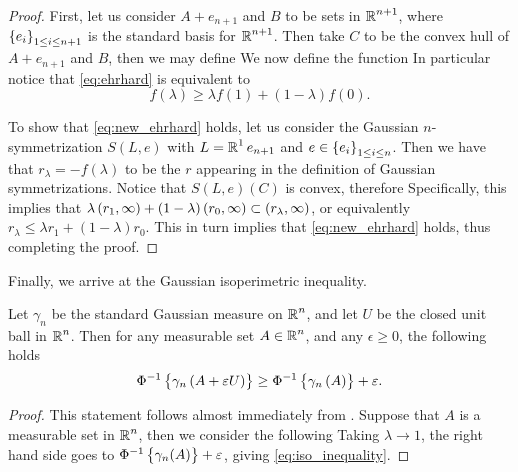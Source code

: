 \documentclass[../main.tex]{subfiles}
\begin{document}
\begin{proof}
First, let us consider $A+e_{n+1}$ and $B$ to be sets in $\operatorname{\mathbb{R}}^{n+1}$, where $\cbr{e_i}_{1\leq i\leq n+1}$ is the standard basis for $\operatorname{\mathbb{R}}^{n+1}$. Then take $C$ to be the convex hull of $A + e_{n+1}$ and $B$, then we may define  We now define the function  In particular notice that \eqref{eq:ehrhard} is equivalent to 
\begin{equation}
\label{eq:new_ehrhard}
    f(\lambda)\geq\lambda f(1) + (1-\lambda)f(0).
\end{equation}

To show that \eqref{eq:new_ehrhard} holds, let us consider the Gaussian $n$-symmetrization $S(L,e)$ with $L = \operatorname{\mathbb{R}}^1e_{n+1}$ and $e\in\cbr{e_i}_{1\leq i\leq n}$. Then we have that $r_\lambda = -f(\lambda)$ to be the $r$ appearing in the definition of Gaussian symmetrizations. Notice that $S(L,e)(C)$ is convex, therefore  Specifically, this implies that $\lambda\intoo{r_1,\infty} + (1-\lambda)\intoo{r_0,\infty} \subset \intoo{r_\lambda,\infty}$, or equivalently $r_\lambda\leq \lambda r_1 + (1-\lambda)r_0$. This in turn implies that \eqref{eq:new_ehrhard} holds, thus completing the proof.
\end{proof}

Finally, we arrive at the Gaussian isoperimetric inequality.
\begin{theorem}
\label{the:gaussian_isoperimetric_inequality}
Let $\gamma_n$ be the standard Gaussian measure on $\operatorname{\mathbb{R}}^n$, and let $U$ be the closed unit ball in $\operatorname{\mathbb{R}}^n$. Then for any measurable set $A\in\operatorname{\mathbb{R}}^n$, and any $\epsilon\geq0$, the following holds 
\begin{equation}
    \label{eq:iso_inequality}
    \Phi^{-1}\cbr{\gamma_n\del{A+\epsilon U}}\geq \Phi^{-1}\cbr{\gamma_n\del{A}} + \epsilon.
\end{equation}
\end{theorem}
\begin{proof}
This statement follows almost immediately from . Suppose that $A$ is a measurable set in $\operatorname{\mathbb{R}}^n$, then we consider the following  Taking $\lambda\to 1$, the right hand side goes to $\Phi^{-1}\cbr{\gamma_n(A)} + \epsilon$, giving \eqref{eq:iso_inequality}.
\end{proof}
\end{document}
